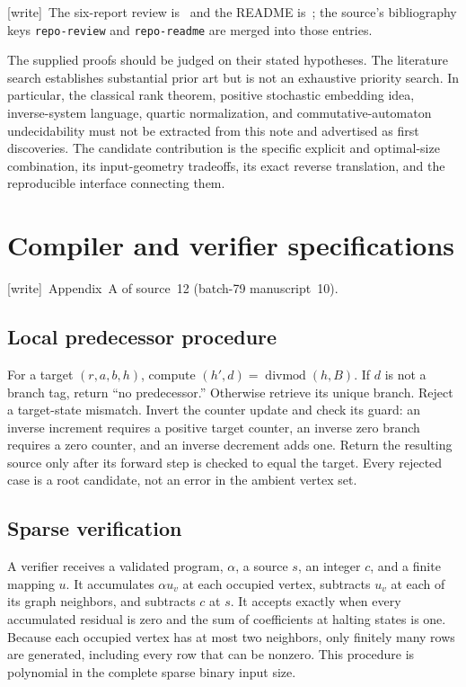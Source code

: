 \documentclass[11pt,letterpaper]{article}
\theoremstyle{definition}
\theoremstyle{remark}
\newcommand{\wtag}{\textup{[write]}}
\begin{document}
\wtag\ The six-report review is~\cite{review1977} and the README is~\cite{repoH10}; the source's bibliography keys \texttt{repo-review} and \texttt{repo-readme} are merged into those entries.

The supplied proofs should be judged on their stated hypotheses. The literature
search establishes substantial prior art but is not an exhaustive priority
search. In particular, the classical rank theorem, positive stochastic
embedding idea, inverse-system language, quartic normalization, and
commutative-automaton undecidability must not be extracted from this note and
advertised as first discoveries. The candidate contribution is the specific
explicit and optimal-size combination, its input-geometry tradeoffs, its exact
reverse translation, and the reproducible interface connecting them.

\section{Compiler and verifier specifications}\label{ste:cg:app:spec}

\noindent\wtag\ Appendix~A of source~12 (batch-79 manuscript~10).

\subsection{Local predecessor procedure}
For a target $(r,a,b,h)$, compute $(h',d)=\operatorname{divmod}(h,B)$.
If $d$ is not a branch tag, return ``no predecessor.'' Otherwise retrieve
its unique branch. Reject a target-state mismatch. Invert the counter
update and check its guard: an inverse increment requires a positive
target counter, an inverse zero branch requires a zero counter, and an
inverse decrement adds one. Return the resulting source only after its
forward step is checked to equal the target. Every rejected case is a
root candidate, not an error in the ambient vertex set.

\subsection{Sparse verification}
A verifier receives a validated program, $\alpha$, a source $s$, an integer
$c$, and a finite mapping $u$. It accumulates $\alpha u_v$ at each occupied
vertex, subtracts $u_v$ at each of its graph neighbors, and subtracts $c$
at $s$. It accepts exactly when every accumulated residual is zero and
the sum of coefficients at halting states is one. Because each occupied
vertex has at most two neighbors, only finitely many rows are generated,
including every row that can be nonzero. This procedure is polynomial in
the complete sparse binary input size.
\end{document}
